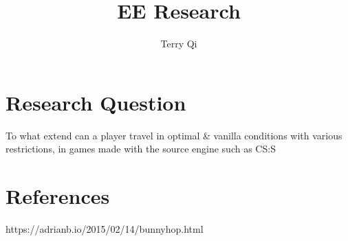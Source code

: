 \documentclass[a4paper,12pt]{article}
\title{EE Research}
\author{Terry Qi}
\begin{document}
\maketitle
\newpage

\section{Research Question}

To what extend can a player travel in optimal \& vanilla conditions with various restrictions, in games made with the source engine such as CS:S

\section{References}

https://adrianb.io/2015/02/14/bunnyhop.html
\end{document}
